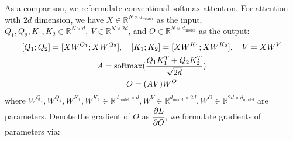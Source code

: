\documentclass{article}
\newcommand{\softmax}{\mathrm{softmax}}
\begin{document}
As a comparison, we reformulate conventional $\softmax$ attention. For attention with $2d$ dimension, we have $X \in \mathbb{R}^{N \times d_{\text{model}}}$ as the input, $Q_1, Q_2, K_1, K_2 \in \mathbb{R}^{N \times d}, \ V \in \mathbb{R}^{N \times 2d}$, and $O \in \mathbb{R}^{N \times d_{\text{model}}}$ as the output:
\begin{equation}
\begin{gathered}
\label{eq:reattn}
\relax [Q_1 ; Q_2] = [X W^{Q_1} ; X W^{Q_2}] ,\quad [K_1 ; K_2] = [X W^{K_1} ; X W^{K_2}] ,\quad V = X W^V \\
A = \softmax(\frac{Q_1 K^{T}_1 + Q_2 K^{T}_2}{\sqrt{2d}}) \\
O = (AV)W^O
\end{gathered}    
\end{equation}
where $W^{Q_1}, W^{Q_2}, W^{K_1}, W^{K_2} \in \mathbb{R}^{d_{\text{model}} \times d}, W^V \in \mathbb{R}^{d_{\text{model}} \times 2d}, W^O \in \mathbb{R}^{2d \times d_{\text{model}}}$ are parameters. Denote the gradient of $O$ as $\cfrac{\partial L}{\partial O}$, we formulate gradients of parameters via:
\end{document}
